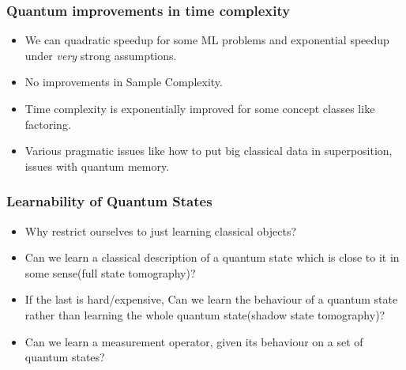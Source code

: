 \documentclass{beamer}
\begin{document}
\begin{frame}
\frametitle{Quantum improvements in time complexity}
    \begin{itemize}
        \item We can quadratic speedup for some ML problems
        and exponential speedup under \textit{very} strong assumptions.

        \item No improvements in Sample Complexity.
        \item Time complexity is exponentially improved for
        some concept classes like factoring.

        \item Various pragmatic issues like how to put big 
        classical data in superposition, issues with quantum memory.

    \end{itemize}
\end{frame}



\begin{frame}
\frametitle{Learnability of Quantum States}
    \begin{itemize}

        \item Why restrict ourselves to just learning classical objects? \pause
	
	\item Can we learn a classical description of a quantum state which is close to it in some sense(full state tomography)? \pause
	
	\item If the last is hard/expensive, Can we learn the behaviour of a quantum state rather than learning the whole quantum state(shadow state tomography)? \pause

	\item Can we learn a measurement operator, given its behaviour on a set of quantum states?


    \end{itemize}
\end{frame}
\end{document}
